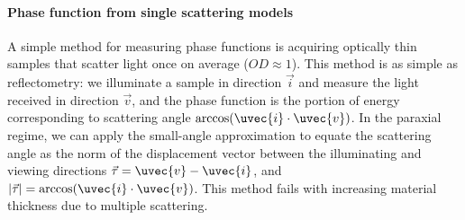 \paragraph{Phase function from single scattering models}
A simple method for measuring phase functions is acquiring optically thin samples that scatter light once on average ($OD \approx 1$). This method is as simple as reflectometry: we illuminate a sample in direction $\vec{i}$ and measure the light received in direction $\vec{v}$, and the phase function is the portion of energy corresponding to scattering angle $\arccos(\uvec{i} \cdot \uvec{v})$. In the paraxial regime, we can apply the small-angle approximation to equate the scattering angle as the norm of the displacement vector between the illuminating and viewing directions $\vec{\tau} = \uvec{v} - \uvec{i}$, and $ |\vec{\tau}| = \arccos(\uvec{i} \cdot \uvec{v})$. This method fails with increasing material thickness due to multiple scattering.
